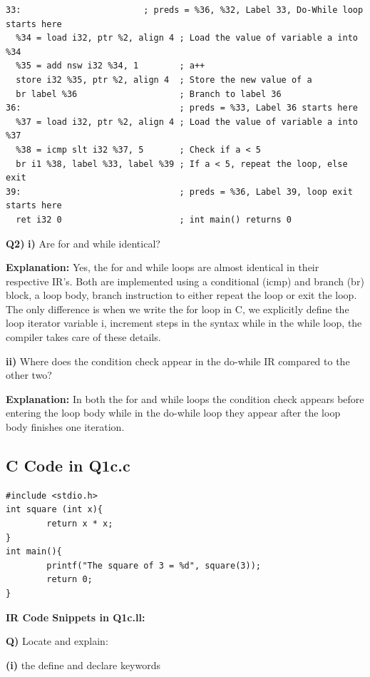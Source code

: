 \begin{lstlisting}
33:                        ; preds = %36, %32, Label 33, Do-While loop starts here
  %34 = load i32, ptr %2, align 4 ; Load the value of variable a into %34
  %35 = add nsw i32 %34, 1        ; a++
  store i32 %35, ptr %2, align 4  ; Store the new value of a
  br label %36                    ; Branch to label 36
36:                               ; preds = %33, Label 36 starts here
  %37 = load i32, ptr %2, align 4 ; Load the value of variable a into %37
  %38 = icmp slt i32 %37, 5       ; Check if a < 5
  br i1 %38, label %33, label %39 ; If a < 5, repeat the loop, else exit
39:                               ; preds = %36, Label 39, loop exit starts here
  ret i32 0                       ; int main() returns 0
\end{lstlisting}

\textbf{Q2)} \textbf{i)} Are for and while identical?


\textbf{Explanation:} Yes, the for and while loops are almost identical in their respective IR's. Both are implemented using a conditional (icmp) and branch (br) block, a loop body, branch instruction to either repeat the loop or exit the loop. The only difference is when we write the for loop in C, we explicitly define the loop iterator variable i, increment steps in the syntax while in the while loop, the compiler takes care of these details.


\textbf{ii) }Where does the condition check appear in the do-while IR compared to the other two?


\textbf{Explanation:} In both the for and while loops the condition check appears before entering the loop body while in the do-while loop they appear after the loop body finishes one iteration.


\subsection{C Code in Q1c.c}

\begin{lstlisting}
#include <stdio.h>
int square (int x){
        return x * x;
}
int main(){
        printf("The square of 3 = %d", square(3));
        return 0;
}
\end{lstlisting}

\medskip\noindent\textbf{IR Code Snippets in Q1c.ll:}\par

\textbf{Q)} Locate and explain: 


\textbf{(i)} the define and declare keywords


